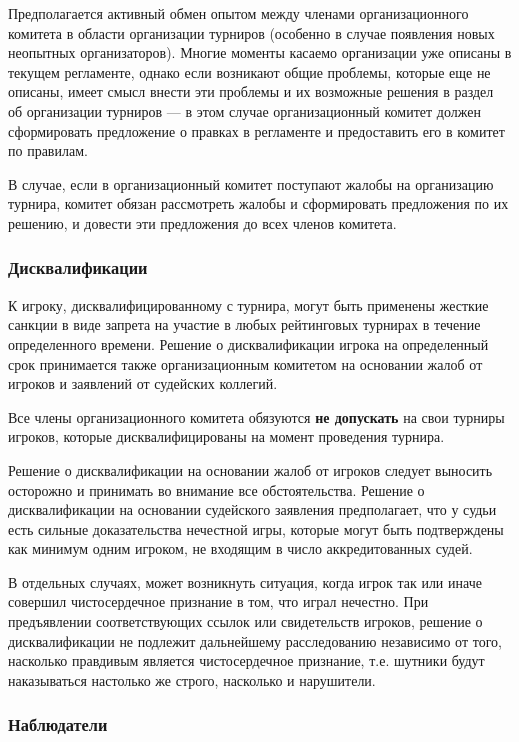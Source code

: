 Предполагается активный обмен опытом между членами организационного комитета в области организации турниров (особенно в случае появления новых неопытных организаторов). Многие моменты касаемо организации уже описаны в текущем регламенте, однако если возникают общие проблемы, которые еще не описаны, имеет смысл внести эти проблемы и их возможные решения в раздел об организации турниров --- в этом случае организационный комитет должен сформировать предложение о правках в регламенте и предоставить его в комитет по правилам.

В случае, если в организационный комитет поступают жалобы на организацию турнира, комитет обязан рассмотреть жалобы и сформировать предложения по их решению, и довести эти предложения до всех членов комитета.

\subsubsection{Дисквалификации}

К игроку, дисквалифицированному с турнира, могут быть применены жесткие санкции в виде запрета на участие в любых рейтинговых турнирах в течение определенного времени. Решение о дисквалификации игрока на определенный срок принимается также организационным комитетом на основании жалоб от игроков и заявлений от судейских коллегий.

Все члены организационного комитета обязуются \textbf{не допускать} на свои турниры игроков, которые дисквалифицированы на момент проведения турнира.

Решение о дисквалификации на основании жалоб от игроков следует выносить осторожно и принимать во внимание все обстоятельства. Решение о дисквалификации на основании судейского заявления предполагает, что у судьи есть сильные доказательства нечестной игры, которые могут быть подтверждены как минимум одним игроком, не входящим в число аккредитованных судей.

В отдельных случаях, может возникнуть ситуация, когда игрок так или иначе совершил чистосердечное признание в том, что играл нечестно. При предъявлении соответствующих ссылок или свидетельств игроков, решение о дисквалификации не подлежит дальнейшему расследованию независимо от того, насколько правдивым является чистосердечное признание, т.е. шутники будут наказываться настолько же строго, насколько и нарушители.

\subsubsection{Наблюдатели}

